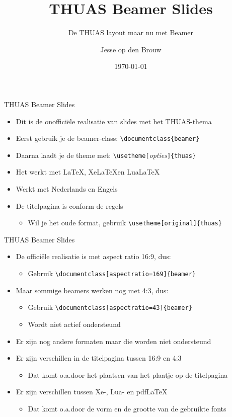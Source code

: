 \documentclass[fleqn,aspectratio=169,dutch,10pt]{beamer}
\title{THUAS Beamer Slides}
\subtitle{De THUAS layout maar nu met Beamer}
\author{Jesse op den Brouw}
\date{\today}
\begin{document}
\maketitle


\begin{frame}[fragile]{THUAS Beamer Slides}
\begin{itemize}
\item Dit is de onofficiële realisatie van slides met het THUAS-thema
\item Eerst gebruik je de beamer-class: \lstinline|\documentclass{beamer}|
\item Daarna laadt je de theme met: \lstinline|\usetheme[|\emph{\small opties}\lstinline|]{thuas}|
\item Het werkt met \LaTeX, Xe\LaTeX en Lua\LaTeX
\item Werkt met Nederlands en Engels
\item De titelpagina is conform de regels
\begin{itemize}
\item Wil je het oude format, gebruik \lstinline|\usetheme[original]{thuas}|
\end{itemize}
\end{itemize}
\end{frame}


\begin{frame}[fragile]{THUAS Beamer Slides}
\begin{itemize}
\item De officiële realisatie is met aspect ratio 16:9, dus:
\begin{itemize}
\item Gebruik \lstinline|\documentclass[aspectratio=169]{beamer}|
\end{itemize}
\item Maar sommige beamers werken nog met 4:3, dus:
\begin{itemize}
\item Gebruik \lstinline|\documentclass[aspectratio=43]{beamer}|
\item Wordt niet actief ondersteund
\end{itemize}
\item Er zijn nog andere formaten maar die worden niet ondersteund
\item Er zijn verschillen in de titelpagina tussen 16:9 en 4:3
\begin{itemize}
\item Dat komt o.a.\@ door het plaatsen van het plaatje op de titelpagina
\end{itemize}
\item Er zijn verschillen tussen Xe-, Lua- en pdf\LaTeX
\begin{itemize}
\item Dat komt o.a.\@ door de vorm en de grootte van de gebruikte fonts
\end{itemize}
\end{itemize}
\end{frame}
\end{document}
